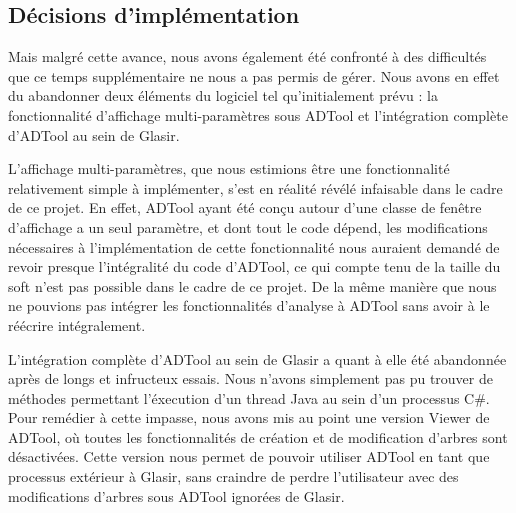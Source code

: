 \subsection{Décisions d'implémentation}
\label{sec:decisions}

Mais malgré cette avance, nous avons également été confronté  à des difficultés que ce temps supplémentaire ne nous a pas permis de gérer. Nous avons en effet du abandonner deux éléments du logiciel tel qu'initialement prévu : la fonctionnalité d'affichage multi-paramètres sous ADTool et l'intégration complète d'ADTool au sein de Glasir.

L'affichage multi-paramètres, que nous estimions être une fonctionnalité relativement simple à implémenter, s'est en réalité révélé infaisable dans le cadre de ce projet. En effet, ADTool ayant été conçu autour d'une classe de fenêtre d'affichage a un seul paramètre, et dont tout le code dépend, les modifications nécessaires à l'implémentation de cette fonctionnalité nous auraient demandé de revoir presque l'intégralité du code d'ADTool, ce qui compte tenu de la taille du soft 
n'est pas  possible dans le cadre de ce projet. De la même manière que nous ne pouvions pas intégrer les fonctionnalités d'analyse à ADTool sans avoir à le réécrire intégralement.

L'intégration complète d'ADTool au sein de Glasir a quant à elle été abandonnée après de longs et infructeux essais. 
Nous n'avons simplement pas pu trouver de méthodes permettant l'éxecution d'un thread Java au sein d'un processus C\#. Pour remédier à cette impasse, nous avons mis au point une version \og Viewer \fg de ADTool, où toutes les fonctionnalités de création et de modification d'arbres sont désactivées. Cette version nous permet de pouvoir utiliser ADTool en tant que processus extérieur à Glasir, sans craindre de perdre l'utilisateur avec des modifications d'arbres sous ADTool ignorées de Glasir.  

